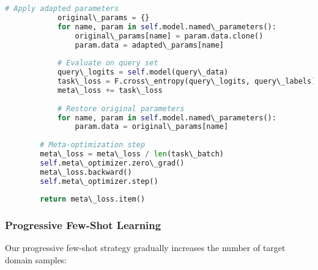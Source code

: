\documentclass[journal]{IEEEtran}
\begin{document}
\begin{lstlisting}[language=Python, caption=MAML Implementation for Few-Shot Learning]
            # Apply adapted parameters
            original\_params = {}
            for name, param in self.model.named\_parameters():
                original\_params[name] = param.data.clone()
                param.data = adapted\_params[name]
            
            # Evaluate on query set
            query\_logits = self.model(query\_data)
            task\_loss = F.cross\_entropy(query\_logits, query\_labels)
            meta\_loss += task\_loss
            
            # Restore original parameters
            for name, param in self.model.named\_parameters():
                param.data = original\_params[name]
        
        # Meta-optimization step
        meta\_loss = meta\_loss / len(task\_batch)
        self.meta\_optimizer.zero\_grad()
        meta\_loss.backward()
        self.meta\_optimizer.step()
        
        return meta\_loss.item()
\end{lstlisting}

\subsubsection{Progressive Few-Shot Learning}

Our progressive few-shot strategy gradually increases the number of target domain samples:
\end{document}
